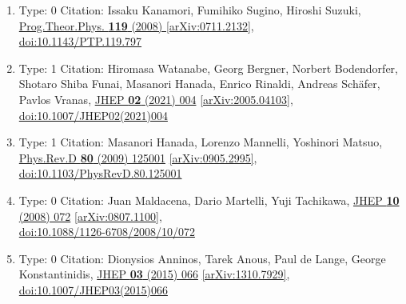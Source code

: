 \documentclass[a4paper,10pt]{article}
\begin{document}
\begin{enumerate}
\begin{enumerate}
  \item Type: 0 Citation: Issaku Kanamori, Fumihiko Sugino, Hiroshi Suzuki, \href{https://www.doi.org/10.1143/PTP.119.797}{Prog.Theor.Phys. {\bf 119} (2008) }  \href{https://arxiv.org/abs/0711.2132}{[arXiv:0711.2132]},\\\href{https://www.doi.org/10.1143/PTP.119.797}{doi:10.1143/PTP.119.797}
  \item Type: 1 Citation: Hiromasa Watanabe, Georg Bergner, Norbert Bodendorfer, Shotaro Shiba Funai, Masanori Hanada, Enrico Rinaldi, Andreas Schäfer, Pavlos Vranas, \href{https://www.doi.org/10.1007/JHEP02(2021)004}{JHEP {\bf 02} (2021) 004}  \href{https://arxiv.org/abs/2005.04103}{[arXiv:2005.04103]},\\\href{https://www.doi.org/10.1007/JHEP02(2021)004}{doi:10.1007/JHEP02(2021)004}
  \item Type: 1 Citation: Masanori Hanada, Lorenzo Mannelli, Yoshinori Matsuo, \href{https://www.doi.org/10.1103/PhysRevD.80.125001}{Phys.Rev.D {\bf 80} (2009) 125001}  \href{https://arxiv.org/abs/0905.2995}{[arXiv:0905.2995]},\\\href{https://www.doi.org/10.1103/PhysRevD.80.125001}{doi:10.1103/PhysRevD.80.125001}
  \item Type: 0 Citation: Juan Maldacena, Dario Martelli, Yuji Tachikawa, \href{https://www.doi.org/10.1088/1126-6708/2008/10/072}{JHEP {\bf 10} (2008) 072}  \href{https://arxiv.org/abs/0807.1100}{[arXiv:0807.1100]},\\\href{https://www.doi.org/10.1088/1126-6708/2008/10/072}{doi:10.1088/1126-6708/2008/10/072}
  \item Type: 0 Citation: Dionysios Anninos, Tarek Anous, Paul de Lange, George Konstantinidis, \href{https://www.doi.org/10.1007/JHEP03(2015)066}{JHEP {\bf 03} (2015) 066}  \href{https://arxiv.org/abs/1310.7929}{[arXiv:1310.7929]},\\\href{https://www.doi.org/10.1007/JHEP03(2015)066}{doi:10.1007/JHEP03(2015)066}

\end{enumerate}
\end{enumerate}
\end{document}
